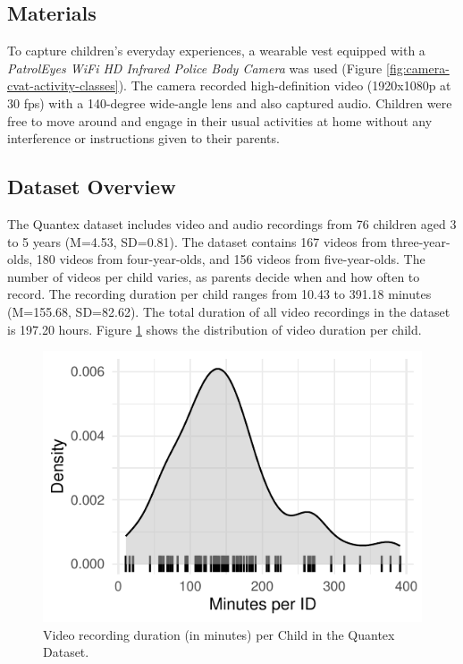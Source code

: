 \documentclass[
  man,floatsintext]{apa6}
\begin{document}
\subsection{Materials}\label{sup-materials}

To capture children's everyday experiences, a wearable vest equipped with a \emph{PatrolEyes WiFi HD Infrared Police Body Camera} was used (Figure \ref{fig:camera-cvat-activity-classes}). The camera recorded high-definition video (1920x1080p at 30 fps) with a 140-degree wide-angle lens and also captured audio. Children were free to move around and engage in their usual activities at home without any interference or instructions given to their parents.

\subsection{Dataset Overview}\label{sup-dataset}

The Quantex dataset includes video and audio recordings from 76 children aged 3 to 5 years (M=4.53, SD=0.81). The dataset contains 167 videos from three-year-olds, 180 videos from four-year-olds, and 156 videos from five-year-olds. The number of videos per child varies, as parents decide when and how often to record. The recording duration per child ranges from 10.43 to 391.18 minutes (M=155.68, SD=82.62). The total duration of all video recordings in the dataset is 197.20 hours. Figure \ref{fig:sup-quantex-minutes-per-child} shows the distribution of video duration per child.

\begin{figure}

{\centering \includegraphics{Quantex_interaction_paper_files/figure-latex/sup-quantex-minutes-per-child-1} 

}

\caption{Video recording duration (in minutes) per Child in the Quantex Dataset.}\label{fig:sup-quantex-minutes-per-child}
\end{figure}
\end{document}
